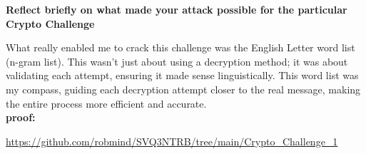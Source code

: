 \documentclass[12pt]{amsart}
\begin{document}
{\bf Reflect briefly on what made your attack possible for the particular Crypto Challenge}

\bigskip

What really enabled me to crack this challenge was the English Letter word list (n-gram list). This wasn't just about using a decryption method; it was about validating each attempt, ensuring it made sense linguistically. This word list was my compass, guiding each decryption attempt closer to the real message, making the entire process more efficient and accurate. \\

{\bf proof:}

\bigskip

\url{https://github.com/robmind/SVQ3NTRB/tree/main/Crypto_Challenge_1}
 \\


\bigskip
\end{document}
